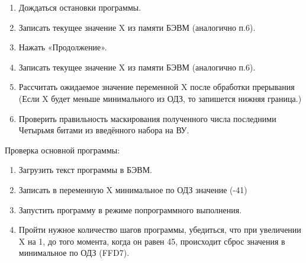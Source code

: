 \begin{enumerate}
    \item Дождаться остановки программы.
    \item Записать текущее значение X из памяти БЭВМ (аналогично п.6).
    \item Нажать «Продолжение».
    \item Записать текущее значение X из памяти БЭВМ (аналогично п.6).
    \item Рассчитать ожидаемое значение переменной X после обработки прерывания \\
    (Если X будет меньше минимального из ОДЗ, то запишется нижняя граница.)
    \item Проверить правильность маскирования полученного числа последними\\
    Четырьмя битами из введённого набора на ВУ.
\end{enumerate}
Проверка основной программы:
\begin{enumerate}
    \item Загрузить текст программы в БЭВМ.
    \item Записать в переменную X минимальное по ОДЗ значение (-41)
    \item Запустить программу в режиме попрограммного выполнения.
    \item Пройти нужное количество шагов программы, убедиться, что при увеличении X на 1, до того момента, когда он равен 45, происходит сброс значения в
    минимальное по ОДЗ (FFD7).
\end{enumerate}

